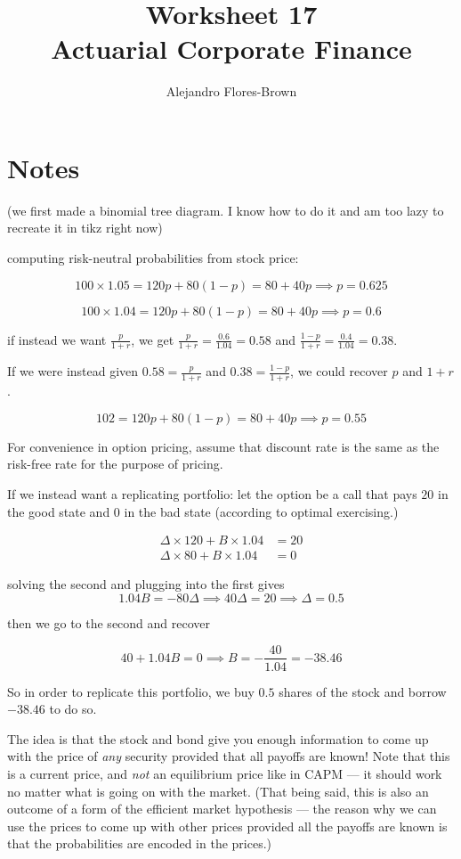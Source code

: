 \documentclass[12pt, letterpaper]{article}
\title{Worksheet 17 \\ Actuarial Corporate Finance}
\author{Alejandro Flores-Brown}
\begin{document}
    \maketitle

    \section{Notes}

    (we first made a binomial tree diagram. I know how to do it and am too lazy to recreate it in tikz right now)

    computing risk-neutral probabilities from stock price:

    \[ 100 \times 1.05 = 120 p + 80 (1 - p) = 80 + 40 p \implies p = 0.625  \]


    \[ 100 \times 1.04 = 120 p + 80 (1 - p) = 80 + 40 p \implies p = 0.6   \]

    if instead we want \(\frac{p}{1+r}\), we get \(\frac{p}{1+r} = \frac{0.6}{1.04} = 0.58\) and \(\frac{1 - p}{1 + r} = \frac{0.4}{1.04} = 0.38\).

    If we were instead given \(0.58 = \frac{p}{1+r}\) and \(0.38 = \frac{1 - p}{1 + r}\), we could recover \(p\) and \(1+r\).

    \[ 102 = 120 p + 80 ( 1 - p ) = 80 + 40 p \implies p = 0.55    \]

    For convenience in option pricing, assume that discount rate is the same as the risk-free rate for the purpose of pricing.
    
    If we instead want a replicating portfolio: let the option be a call that pays \(20\) in the good state and \(0\) in the bad state (according to optimal exercising.)

    \begin{align*}
    \Delta \times 120 + B \times 1.04 &= 20 \\
    \Delta \times 80 + B \times 1.04 &= 0
    \end{align*}

    solving the second and plugging into the first gives
    \[ 1.04 B = - 80 \Delta \implies 40 \Delta = 20 \implies \Delta = 0.5   \]

    then we go to the second and recover

    \[ 40 + 1.04 B = 0 \implies B = - \frac{40}{1.04} = - 38.46   \]

    So in order to replicate this portfolio, we buy \(0.5\) shares of the stock and borrow \(-38.46\) to do so.

    The idea is that the stock and bond give you enough information to come up with the price of \emph{any} security provided that all payoffs are known! Note that this is a current price, and \emph{not} an equilibrium price like in CAPM --- it should work no matter what is going on with the market. (That being said, this is also an outcome of a form of the efficient market hypothesis --- the reason why we can use the prices to come up with other prices provided all the payoffs are known is that the probabilities are encoded in the prices.)
\end{document}
